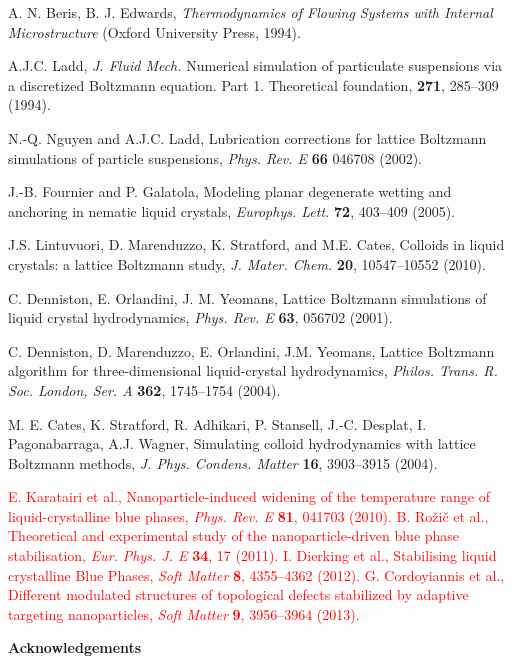 \documentclass[12pt]{article}
\begin{document}
\begin{thebibliography}{99}
A. N. Beris, B. J. Edwards, 
{\it Thermodynamics of Flowing Systems with Internal Microstructure}
(Oxford University Press, 1994).

A.J.C. Ladd,
\textit{J. Fluid Mech.} Numerical simulation of particulate suspensions via a
discretized Boltzmann equation. Part 1. Theoretical foundation,
\textbf{271}, 285--309 (1994).

N.-Q. Nguyen and A.J.C. Ladd,
Lubrication corrections for lattice Boltzmann simulations of particle
suspensions,
\textit{Phys. Rev. E} \textbf{66} 046708 (2002).

J.-B. Fournier and P. Galatola,
Modeling planar degenerate wetting and anchoring in nematic liquid
crystals,
\textit{Europhys. Lett.} \textbf{72}, 403--409 (2005).

J.S. Lintuvuori, D. Marenduzzo, K. Stratford, and M.E. Cates,
Colloids in liquid crystals: a lattice Boltzmann study,
\textit{J. Mater. Chem.} \textbf{20}, 10547--10552 (2010).

C. Denniston, E. Orlandini, J. M. Yeomans,
Lattice Boltzmann simulations of liquid crystal hydrodynamics,
\textit{Phys. Rev. E} \textbf{63}, 056702 (2001).

C. Denniston, D. Marenduzzo, E. Orlandini, J.M. Yeomans,
Lattice Boltzmann algorithm for three-dimensional liquid-crystal
hydrodynamics,
\textit{Philos. Trans. R. Soc. London, Ser. A} \textbf{362}, 1745--1754 (2004).

 M. E. Cates, K. Stratford, R. Adhikari, P. Stansell,
J.-C. Desplat, I. Pagonabarraga, A.J. Wagner,
Simulating colloid hydrodynamics with lattice Boltzmann methods, 
\textit{J. Phys. Condens. Matter} \textbf{16},  3903--3915 (2004).

\textcolor{red}{
 E. Karatairi et al.,
Nanoparticle-induced widening of the temperature range of liquid-crystalline blue phases, 
\textit{Phys. Rev. E} \textbf{81}, 041703 (2010).
 B. Ro\v zi\v c et al.,
Theoretical and experimental study of the nanoparticle-driven blue phase stabilisation,
\textit{Eur. Phys. J. E} \textbf{34}, 17 (2011).
 I. Dierking et al.,
Stabilising liquid crystalline Blue Phases,
\textit{Soft Matter} \textbf{8}, 4355--4362 (2012).
 G. Cordoyiannis et al.,
Different modulated structures of topological defects stabilized by adaptive targeting nanoparticles, \textit{Soft Matter} \textbf{9}, 3956--3964 (2013).
}

\end{thebibliography}
\noindent
\textbf{\large Acknowledgements}
\end{document}
